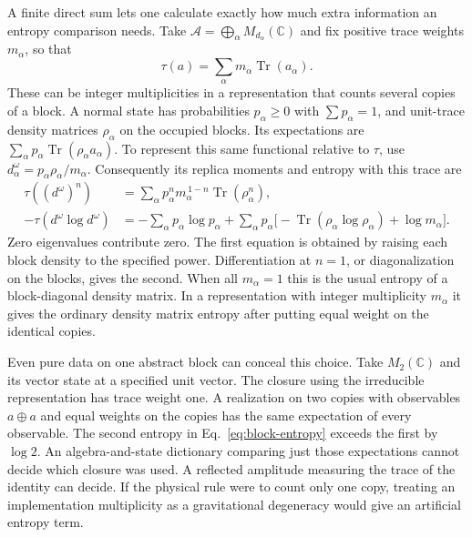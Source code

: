 \documentclass[11pt,letterpaper]{article}
\begin{document}
A finite direct sum lets one calculate exactly how much extra information
an entropy comparison needs. Take
\(\mathcal A=\bigoplus_\alpha M_{d_\alpha}(\mathbb C)\) and fix
positive trace weights \(m_\alpha\), so that
\[
 \tau(a)=\sum_\alpha m_\alpha\operatorname{Tr}(a_\alpha).
\]
These can be integer multiplicities in a representation that counts
several copies of a block. A normal state has probabilities
\(p_\alpha\ge0\) with \(\sum p_\alpha=1\), and unit-trace density
matrices \(\rho_\alpha\) on the occupied blocks. Its expectations are
\(\sum_\alpha p_\alpha\operatorname{Tr}(\rho_\alpha a_\alpha)\).
To represent this same functional relative to \(\tau\), use
\(d_\alpha^\omega=p_\alpha\rho_\alpha/m_\alpha\).
Consequently its replica moments and entropy with this trace are
\begin{align}
 \tau((d^\omega)^n)&=
 \sum_\alpha p_\alpha^n m_\alpha^{\,1-n}
                   \operatorname{Tr}(\rho_\alpha^n),\\
 -\tau(d^\omega\log d^\omega)&=
 -\sum_\alpha p_\alpha\log p_\alpha+
 \sum_\alpha p_\alpha
     \bigl[-\operatorname{Tr}(\rho_\alpha\log\rho_\alpha)
                       +\log m_\alpha\bigr].
 \label{eq:block-entropy}
\end{align}
Zero eigenvalues contribute zero. The first equation is obtained by
raising each block density to the specified power. Differentiation at
\(n=1\), or diagonalization on the blocks, gives the second.
When all \(m_\alpha=1\) this is the usual entropy of a block-diagonal
density matrix. In a representation with integer multiplicity
\(m_\alpha\) it gives the ordinary density matrix entropy after putting
equal weight on the identical copies.

Even pure data on one abstract block can conceal this choice.
Take \(M_2(\mathbb C)\) and its vector state at a specified unit vector.
The closure using the irreducible representation has trace weight one.
A realization on two copies with observables \(a\oplus a\) and equal
weights on the copies has the same expectation of every observable.
The second entropy in Eq.~\eqref{eq:block-entropy} exceeds the first
by \(\log 2\). An algebra-and-state dictionary comparing just those
expectations cannot decide which closure was used. A reflected amplitude
measuring the trace of the identity can decide. If the physical rule
were to count only one copy, treating an implementation multiplicity
as a gravitational degeneracy would give an artificial entropy term.
\end{document}
